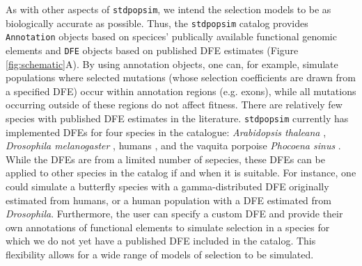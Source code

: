 \documentclass[hidelinks]{article}
\newcommand{\stdpopsim}{\texttt{stdpopsim}\xspace}
\begin{document}
    As with other aspects of \stdpopsim, we intend the selection models to be as biologically accurate as possible.
    Thus, the \stdpopsim catalog provides \texttt{Annotation} objects based on specices' publically available functional genomic elements 
    and \texttt{DFE} objects based on published DFE estimates (Figure \ref{fig:schematic}A).
    By using annotation objects, one can, for example, simulate populations where selected mutations (whose selection
    coefficients are drawn from a specified DFE) occur within annotation regions (e.g. exons), while all mutations
    occurring outside of these regions do not affect fitness.
    There are relatively few species with published DFE estimates in the literature.
    \stdpopsim currently has implemented DFEs for four species in the catalogue:
    \textit{Arabidopsis thaleana} \citep{huber2018gene}, \textit{Drosophila melanogaster} \citep{ragsdale2016triallelic,huber2017determining},
    humans \citep{huber2017determining,kim2017inference}, and the vaquita porpoise \textit{Phocoena sinus} \citep{robinson2022critically}.
    While the DFEs are from a limited number of sepecies, these DFEs can be applied to other species
    in the catalog if and when it is suitable. 
    For instance, one could simulate a butterfly species with a gamma-distributed DFE originally
    estimated from humans, or a human population with a DFE estimated from \textit{Drosophila}.
    Furthermore, the user can specify a custom DFE and provide their own annotations
    of functional elements to simulate selection in a species for which we do not yet have 
    a published DFE included in the catalog. This flexibility allows for a wide range of
    models of selection to be simulated. %
   
\end{document}
